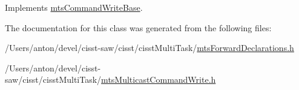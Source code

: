 Implements \hyperlink{classmts_command_write_base_a2bf3f188291d690478be5452ba5ba42d}{mts\+Command\+Write\+Base}.



The documentation for this class was generated from the following files\+:\begin{DoxyCompactItemize}
\item 
/\+Users/anton/devel/cisst-\/saw/cisst/cisst\+Multi\+Task/\hyperlink{mts_forward_declarations_8h}{mts\+Forward\+Declarations.\+h}\item 
/\+Users/anton/devel/cisst-\/saw/cisst/cisst\+Multi\+Task/\hyperlink{mts_multicast_command_write_8h}{mts\+Multicast\+Command\+Write.\+h}\end{DoxyCompactItemize}
